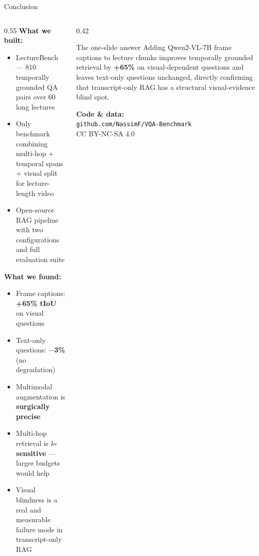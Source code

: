 \documentclass[aspectratio=169,t]{beamer}
\begin{document}
\begin{frame}{Conclusion}

\begin{columns}[T]
\begin{column}{0.55\textwidth}
  \textbf{What we built:}
  \begin{itemize}
    \item LectureBench — 810 temporally grounded QA pairs over 60 long lectures
    \item Only benchmark combining multi-hop + temporal spans + visual split for lecture-length video
    \item Open-source RAG pipeline with two configurations and full evaluation suite
  \end{itemize}

  \medskip
  \textbf{What we found:}
  \begin{itemize}
    \item Frame captions: \textbf{+65\% tIoU} on visual questions
    \item Text-only questions: \textbf{$-$3\%} (no degradation)
    \item Multimodal augmentation is \textbf{surgically precise}
    \item Multi-hop retrieval is \textbf{$k$-sensitive} — larger budgets would help
    \item Visual blindness is a real and measurable failure mode in transcript-only RAG
  \end{itemize}
\end{column}
\begin{column}{0.42\textwidth}
  \begin{exampleblock}{The one-slide answer}
    Adding Qwen2-VL-7B frame captions to lecture chunks improves temporally
    grounded retrieval by \textbf{+65\%} on visual-dependent questions
    and leaves text-only questions unchanged, directly confirming that
    transcript-only RAG has a structural visual-evidence blind spot.
  \end{exampleblock}

  \bigskip
  \textbf{Code \& data:}\\
  \small\texttt{github.com/NassimF/VQA-Benchmark}\\
  CC BY-NC-SA 4.0
\end{column}
\end{columns}

\end{frame}
\end{document}
